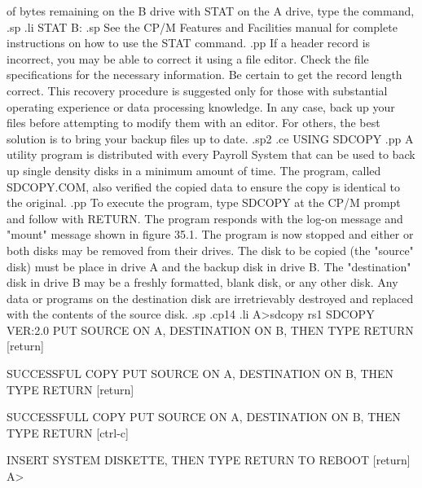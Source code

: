 of bytes remaining on the B drive with STAT on the A drive, type
the command,
.sp
.li
	    STAT B:
.sp
See the CP/M Features and Facilities manual for complete instructions
on how to use the STAT command.
.pp
If a header record is incorrect, you may be able to correct it using a file
editor.  Check the file specifications for the necessary
information.  Be certain to get the record length correct.  This
recovery procedure is suggested only for those with substantial
operating experience or data processing knowledge.  In any case,
back up your files before attempting to modify them with an editor.
For others, the best solution is to bring your backup files up to date.
.sp2
.ce
USING SDCOPY
.pp
A utility program is distributed with every Payroll System that can be
used to back up single density disks in a minimum amount of time.
The program, called SDCOPY.COM, also verified the copied data to ensure
the copy is identical to the original.
.pp
To execute the program, type SDCOPY at the CP/M prompt and follow with
RETURN.  The program responds with the log-on message and "mount" message
shown in figure 35.1.  The program is now stopped and either or both
disks may be removed from their drives.  The disk to be copied (the "source"
disk) must be
place in drive A and the backup disk in drive B.  The "destination" disk
in drive B may be a freshly formatted, blank disk, or any other disk.
Any data or programs on the destination disk are irretrievably destroyed
and replaced with the contents of the source disk.
.sp
.cp14
.li
    A>sdcopy rs1
    SDCOPY VER:2.0
    PUT SOURCE ON A, DESTINATION ON B, THEN TYPE RETURN  [return]

    SUCCESSFUL COPY
    PUT SOURCE ON A, DESTINATION ON B, THEN TYPE RETURN  [return]

    SUCCESSFULL COPY
    PUT SOURCE ON A, DESTINATION ON B, THEN TYPE RETURN  [ctrl-c]

    INSERT SYSTEM DISKETTE, THEN TYPE RETURN TO REBOOT	 [return]
    A>

